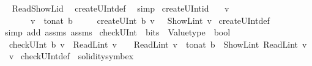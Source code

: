 \begin{isabellebody}
\ %
\endisadelimproof
%
\isatagproof
{}\isamarkupfalse%
\ Read{\isacharunderscore}{\kern0pt}ShowL{\isacharunderscore}{\kern0pt}id\ \isamarkupfalse%
\ createUInt{\isacharunderscore}{\kern0pt}def\ \isamarkupfalse%
\ simp%
\endisatagproof
{\isafoldproof}%
%
\isadelimproof
%
\endisadelimproof
\isanewline
\isanewline
{}\isamarkupfalse%
\ createUInt{\isacharunderscore}{\kern0pt}id{\isacharcolon}{\kern0pt}\isanewline
\ \ \ {\isachardoublequoteopen}v\ {\isasymge}\ {}{\isachardoublequoteclose}\isanewline
\ \ \ \ \ \ \ {\isachardoublequoteopen}v\ {\isacharless}{\kern0pt}\ {}{\isacharcircum}{\kern0pt}{\isacharparenleft}{\kern0pt}to{\isacharunderscore}{\kern0pt}nat\ b{\isacharparenright}{\kern0pt}{\isachardoublequoteclose}\isanewline
\ \ \ \ \ {\isachardoublequoteopen}createUInt\ b\ v\ {\isacharequal}{\kern0pt}\ \ ShowL\isactrlsub i\isactrlsub n\isactrlsub t\ v{\isachardoublequoteclose}\isanewline
%
\isadelimproof
%
\endisadelimproof
%
\isatagproof
{}\isamarkupfalse%
\ createUInt{\isacharunderscore}{\kern0pt}def\ \isamarkupfalse%
\ {\isacharparenleft}{\kern0pt}simp\ add{\isacharcolon}{\kern0pt}\ assms{\isacharparenleft}{\kern0pt}{}{\isacharparenright}{\kern0pt}\ assms{\isacharparenleft}{\kern0pt}{}{\isacharparenright}{\kern0pt}{\isacharparenright}{\kern0pt}%
\endisatagproof
{\isafoldproof}%
%
\isadelimproof
\isanewline
%
\endisadelimproof
\isanewline
{}\isamarkupfalse%
\ checkUInt\ {\isacharcolon}{\kern0pt}{\isacharcolon}{\kern0pt}\ {\isachardoublequoteopen}bits\ {\isasymRightarrow}\ Valuetype\ {\isasymRightarrow}\ bool{\isachardoublequoteclose}\isanewline
{}\isanewline
\ \ {\isachardoublequoteopen}checkUInt\ b\ v\ {\isacharequal}{\kern0pt}\ {\isacharparenleft}{\kern0pt}ReadL\isactrlsub i\isactrlsub n\isactrlsub t\ v\ {\isasymge}\ {}\ {\isasymand}\ ReadL\isactrlsub i\isactrlsub n\isactrlsub t\ v\ {\isacharless}{\kern0pt}\ {}{\isacharcircum}{\kern0pt}{\isacharparenleft}{\kern0pt}to{\isacharunderscore}{\kern0pt}nat\ b{\isacharparenright}{\kern0pt}\ {\isasymand}\ ShowL\isactrlsub i\isactrlsub n\isactrlsub t\ {\isacharparenleft}{\kern0pt}ReadL\isactrlsub i\isactrlsub n\isactrlsub t\ v{\isacharparenright}{\kern0pt}\ {\isacharequal}{\kern0pt}\ v{\isacharparenright}{\kern0pt}{\isachardoublequoteclose}\isanewline
{}\isamarkupfalse%
\ checkUInt{\isacharunderscore}{\kern0pt}def\ \ {\isacharbrackleft}{\kern0pt}solidity{\isacharunderscore}{\kern0pt}symbex{\isacharbrackright}{\kern0pt}\isanewline

\end{isabellebody}
